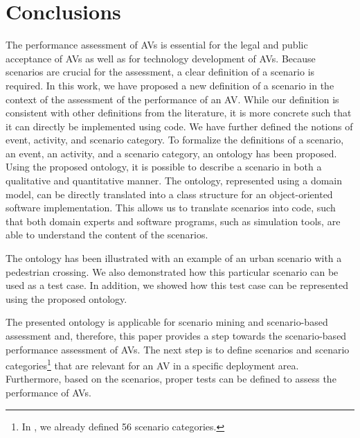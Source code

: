 \cbstart
\section{Conclusions}
\label{sec:conclusion}

The performance assessment of AVs is essential for the legal and public acceptance of AVs as well as for technology development of AVs. 
Because scenarios are crucial for the assessment, a clear definition of a scenario is required.
In this work, we have proposed a new definition of a scenario in the context of the assessment of the performance of an AV. 
\cbstartc 
While our definition is consistent with other definitions from the literature, it is more concrete such that it can directly be implemented using code.
We have further defined the notions of event, activity, and scenario category. 
To formalize the definitions of a scenario, an event, an activity, and a scenario category, an ontology has been proposed. Using the proposed ontology, it is possible to describe a scenario in both a qualitative and quantitative manner. The ontology, represented using a domain model, can be directly translated into a class structure for an object-oriented software implementation. This allows us to translate scenarios into code, such that both domain experts and software programs, such as simulation tools, are able to understand the content of the scenarios. 

\cbstart
The ontology has been illustrated with an example of an urban scenario with a pedestrian crossing. 
We also demonstrated how this particular scenario can be used as a test case. In addition, we showed how this test case can be represented using the proposed ontology.
\cbend

The presented ontology is applicable for scenario mining \cite{paardekooper2019dataset6000km} and scenario-based assessment \cite{elrofai2018scenario} and, therefore, this paper provides a step towards the scenario-based performance assessment of AVs. The next step is to define scenarios and scenario categories\footnote{\cbstart In \cite{degelder2019scenariocategories}, we already defined 56 scenario categories.\cbend} that are relevant for an AV in a specific deployment area. Furthermore, based on the scenarios, proper tests can be defined to assess the performance of AVs. 
\cbend

